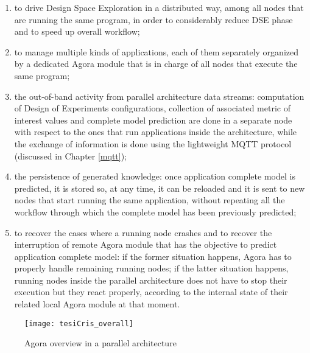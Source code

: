 \begin{enumerate}
    
    \item to drive Design Space Exploration in a distributed way, among all nodes that are running the same program, in order to considerably reduce DSE phase and to speed up overall workflow;
    
    \item to manage multiple kinds of applications, each of them separately organized by a dedicated Agora module that is in charge of all nodes that execute the same program;
    
    \item the out-of-band activity from parallel architecture data streams: computation of Design of Experiments configurations, collection of associated metric of interest values and complete model prediction are done in a separate node with respect to the ones that run applications inside the architecture, while the exchange of information is done using the lightweight MQTT protocol (discussed in Chapter \ref{mqtt});
    
    \item the persistence of generated knowledge: once application complete model is predicted, it is stored so, at any time, it can be reloaded and it is sent to new nodes that start running the same application, without repeating all the workflow through which the complete model has been previously predicted;
    
    \item to recover the cases where a running node crashes and to recover the interruption of remote Agora module that has the objective to predict application complete model: if the former situation happens, Agora has to properly handle remaining running nodes; if the latter situation happens, running nodes inside the parallel architecture does not have to stop their execution but they react properly, according to the internal state of their related local Agora module at that moment.

\end{enumerate}

\begin{figure}[htb]

    \centering
    \texttt{[image: tesiCris\_overall]}
    \caption{Agora overview in a parallel architecture}
    \label{fig::tesiCris_overview}
    
\end{figure}

